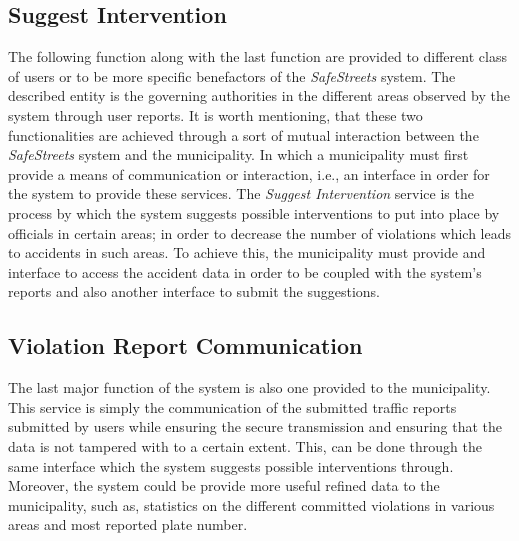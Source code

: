 \subsection{Suggest Intervention}
The following function along with the last function are provided to different class of users or to be more specific benefactors of the \emph{SafeStreets} system. The described entity is the governing authorities in the different areas observed by the system through user reports. It is worth mentioning, that these two functionalities are achieved through a sort of mutual interaction between the \emph{SafeStreets} system and the municipality. In which a municipality must first provide a means of communication or interaction, i.e., an interface in order for the system to provide these services.
The \emph{Suggest Intervention} service is the process by which the system suggests possible interventions  to put into place by officials in certain areas; in order to decrease the number of violations which leads to accidents in such areas. To achieve this, the municipality must provide and interface to access the accident data in order to be coupled with the system's reports and also another interface to submit the suggestions.

\subsection{Violation Report Communication}
The last major function of the system is also one provided to the municipality. This service is simply the communication of the submitted traffic reports submitted by users while ensuring the secure transmission and ensuring that the data is not tampered with to a certain extent. This, can be done through the same interface which the system suggests possible interventions through. Moreover, the system could be provide more useful refined data to the municipality, such as, statistics on the different committed violations in various areas and most reported plate number.